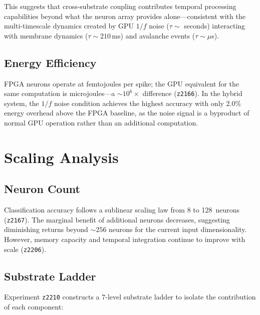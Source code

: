 \documentclass[11pt]{article}
\newcommand{\expt}[1]{\texttt{z#1}}
\begin{document}
This suggests that cross-substrate coupling contributes
temporal processing capabilities beyond what the neuron array
provides alone---consistent with the multi-timescale dynamics
created by GPU $1/f$ noise ($\tau \sim$ seconds) interacting
with membrane dynamics ($\tau \sim 210$\,ms) and avalanche
events ($\tau \sim \mu$s).

\subsection{Energy Efficiency}
\label{sec:energy}

FPGA neurons operate at femtojoules per spike; the GPU
equivalent for the same computation is microjoules---a
$\sim 10^6\times$ difference (\expt{2166}).  In the hybrid
system, the $1/f$ noise condition achieves the highest
accuracy with only 2.0\% energy overhead above the FPGA
baseline, as the noise signal is a byproduct of normal GPU
operation rather than an additional computation.


\section{Scaling Analysis}
\label{sec:scaling}

\subsection{Neuron Count}

Classification accuracy follows a sublinear scaling law from
8 to 128~neurons (\expt{2167}).  The marginal benefit of
additional neurons decreases, suggesting diminishing returns
beyond $\sim 256$ neurons for the current input dimensionality.
However, memory capacity and temporal integration continue to
improve with scale (\expt{2206}).

\subsection{Substrate Ladder}
\label{sec:ladder}

Experiment \expt{2210} constructs a 7-level substrate ladder
to isolate the contribution of each component:
\end{document}
